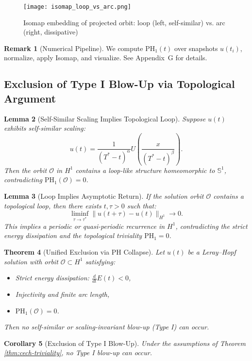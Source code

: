 \documentclass[11pt]{article}
\newtheorem{theorem}{Theorem}[section]
\newtheorem{lemma}[theorem]{Lemma}
\newtheorem{corollary}[theorem]{Corollary}
\theoremstyle{definition}
\newtheorem{remark}[theorem]{Remark}
\begin{document}
\begin{figure}[h]
  \centering
  \texttt{[image: isomap\_loop\_vs\_arc.png]}
  \caption{Isomap embedding of projected orbit: loop (left, self-similar) vs. arc (right, dissipative)}
\end{figure}

\begin{remark}[Numerical Pipeline]
We compute $\mathrm{PH}_1(t)$ over snapshots $u(t_i)$, normalize, apply Isomap, and visualize. See Appendix~G for details.
\end{remark}

\subsection{Exclusion of Type I Blow-Up via Topological Argument}

\begin{lemma}[Self-Similar Scaling Implies Topological Loop]
Suppose $u(t)$ exhibits self-similar scaling:
\[
 u(t) = \frac{1}{(T^* - t)^\alpha} U\left( \frac{x}{(T^* - t)^\beta} \right).
\]
Then the orbit $\mathcal{O}$ in $H^1$ contains a loop-like structure homeomorphic to $\mathbb{S}^1$, contradicting $\mathrm{PH}_1(\mathcal{O}) = 0$.
\end{lemma}

\begin{lemma}[Loop Implies Asymptotic Return]
If the solution orbit $\mathcal{O}$ contains a topological loop, then there exists $t, \tau > 0$ such that:
\[
\liminf_{\tau \to \tau^*} \|u(t + \tau) - u(t)\|_{H^1} \to 0.
\]
This implies a periodic or quasi-periodic recurrence in $H^1$, contradicting the strict energy dissipation and the topological triviality $\mathrm{PH}_1 = 0$.
\end{lemma}

\begin{theorem}[Unified Exclusion via PH Collapse]
Let $u(t)$ be a Leray--Hopf solution with orbit $\mathcal{O} \subset H^1$ satisfying:
\begin{itemize}
  \item Strict energy dissipation: $\frac{d}{dt} E(t) < 0$,
  \item Injectivity and finite arc length,
  \item $\mathrm{PH}_1(\mathcal{O}) = 0$.
\end{itemize}
Then no self-similar or scaling-invariant blow-up (Type I) can occur.
\end{theorem}

\begin{corollary}[Exclusion of Type I Blow-Up]
Under the assumptions of Theorem \ref{thm:cech-triviality}, no Type I blow-up can occur.
\end{corollary}
\end{document}
